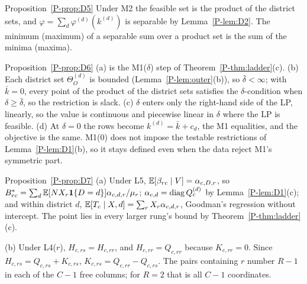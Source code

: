 \begin{proofof}{Proposition~\ref{P-prop:D5}}
Under M2 the feasible set is the product of the district sets, and
$\varphi=\sum_d\varphi^{(d)}(k^{(d)})$ is separable by Lemma~\ref{P-lem:D2}. The minimum
(maximum) of a separable sum over a product set is the sum of the minima (maxima).
\end{proofof}

\begin{proofof}{Proposition~\ref{P-prop:D6}}
(a) is the M1($\delta$) step of Theorem~\ref{P-thm:ladder}(c). (b) Each district set
$\Theta^{(d)}_O$ is bounded (Lemma~\ref{P-lem:outer}(b)), so $\bar\delta<\infty$; with
$\bar k=0$, every point of the product of the district sets satisfies the
$\delta$-condition when $\delta\ge\bar\delta$, so the restriction is slack. (c) $\delta$
enters only the right-hand side of the LP, linearly, so the value is continuous and
piecewise linear in $\delta$ where the LP is feasible. (d) At $\delta=0$ the rows become
$k^{(d)}=\bar k+c_d$, the M1 equalities, and the objective is the same. M1(0) does not
impose the testable restrictions of Lemma~\ref{P-lem:D1}(b), so it stays defined even
when the data reject M1's symmetric part.
\end{proofof}

\begin{proofof}{Proposition~\ref{P-prop:D7}}
(a) Under L5, $\mathbb E[\beta_{rc}\mid V]=\alpha_{c,D,r}$, so
$B^*_{rc}=\sum_d\mathbb E[NX_r\mathbf 1\{D=d\}]\alpha_{c,d,r}/\mu_r$; $\alpha_{c,d}=\operatorname{diag} Q^{(d)}_c$ by
Lemma~\ref{P-lem:D1}(c); and within district $d$,
$\mathbb E[T_c\mid X,d]=\sum_rX_r\alpha_{c,d,r}$, Goodman's regression without intercept. The
point lies in every larger rung's bound by Theorem~\ref{P-thm:ladder}(c).

(b) Under L4($r$), $H_{c,rs}=H_{c,rr}$, and $H_{c,rr}=Q_{c,rr}$ because $K_{c,rr}=0$.
Since $H_{c,rs}=Q_{c,rs}+K_{c,rs}$, $K_{c,rs}=Q_{c,rr}-Q_{c,rs}$. The pairs containing $r$
number $R-1$ in each of the $C-1$ free columns; for $R=2$ that is all $C-1$ coordinates.
\end{proofof}

